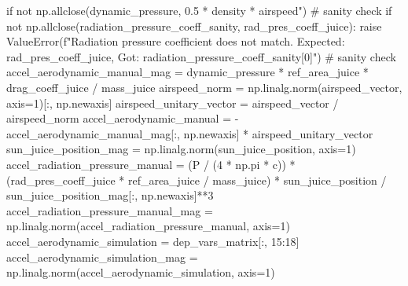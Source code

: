 {}
\markdownRendererSectionEnd \markdownRendererSectionBegin
{}\markdownRendererInterblockSeparator
{}if not np.allclose(dynamic_pressure, 0.5 * density * airspeed") # sanity check if not np.allclose(radiation_pressure_coeff_sanity, rad_pres_coeff_juice): raise ValueError(f"Radiation pressure coefficient does not match. Expected: {rad_pres_coeff_juice}, Got: {radiation_pressure_coeff_sanity[0]}") # sanity check\markdownRendererInterblockSeparator
{}
\markdownRendererSectionEnd \markdownRendererSectionBegin
{}\markdownRendererInterblockSeparator
{}accel_aerodynamic_manual_mag = dynamic_pressure * ref_area_juice * drag_coeff_juice / mass_juice airspeed_norm = np.linalg.norm(airspeed_vector, axis=1)[:, np.newaxis] airspeed_unitary_vector = airspeed_vector / airspeed_norm accel_aerodynamic_manual = -accel_aerodynamic_manual_mag[:, np.newaxis] * airspeed_unitary_vector sun_juice_position_mag = np.linalg.norm(sun_juice_position, axis=1)\markdownRendererInterblockSeparator
{}
\markdownRendererSectionEnd \markdownRendererSectionBegin
{}\markdownRendererInterblockSeparator
{}accel_radiation_pressure_manual = (P / (4 * np.pi * c)) * (rad_pres_coeff_juice * ref_area_juice / mass_juice) * sun_juice_position / sun_juice_position_mag[:, np.newaxis]**3\markdownRendererInterblockSeparator
{}
\markdownRendererSectionEnd \markdownRendererSectionBegin
{}\markdownRendererInterblockSeparator
{}accel_radiation_pressure_manual_mag = np.linalg.norm(accel_radiation_pressure_manual, axis=1)\markdownRendererInterblockSeparator
{}
\markdownRendererSectionEnd \markdownRendererSectionBegin
{}\markdownRendererInterblockSeparator
{}
\markdownRendererSectionEnd \markdownRendererSectionBegin
{}\markdownRendererInterblockSeparator
{}accel_aerodynamic_simulation = dep_vars_matrix[:, 15:18] accel_aerodynamic_simulation_mag = np.linalg.norm(accel_aerodynamic_simulation, axis=1)\markdownRendererInterblockSeparator
{}
\markdownRendererSectionEnd \markdownRendererSectionBegin
{}\markdownRendererInterblockSeparator
